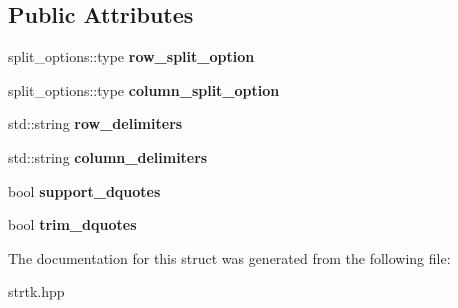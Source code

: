 \subsection*{Public Attributes}
\begin{DoxyCompactItemize}
\item 
\hypertarget{structstrtk_1_1token__grid_1_1options_a37711a26d2bd83d04107cf87e8893cf1}{split\-\_\-options\-::type {\bfseries row\-\_\-split\-\_\-option}}\label{structstrtk_1_1token__grid_1_1options_a37711a26d2bd83d04107cf87e8893cf1}

\item 
\hypertarget{structstrtk_1_1token__grid_1_1options_aa191493315b3802d1ee3b12c8bd0553e}{split\-\_\-options\-::type {\bfseries column\-\_\-split\-\_\-option}}\label{structstrtk_1_1token__grid_1_1options_aa191493315b3802d1ee3b12c8bd0553e}

\item 
\hypertarget{structstrtk_1_1token__grid_1_1options_abd58aa3a83066f92ef50a52055e42bc6}{std\-::string {\bfseries row\-\_\-delimiters}}\label{structstrtk_1_1token__grid_1_1options_abd58aa3a83066f92ef50a52055e42bc6}

\item 
\hypertarget{structstrtk_1_1token__grid_1_1options_a822c2ffc81765ec5b7e2091b64f88a5f}{std\-::string {\bfseries column\-\_\-delimiters}}\label{structstrtk_1_1token__grid_1_1options_a822c2ffc81765ec5b7e2091b64f88a5f}

\item 
\hypertarget{structstrtk_1_1token__grid_1_1options_a6f21807635d2077fab1cb2dd5f8c267c}{bool {\bfseries support\-\_\-dquotes}}\label{structstrtk_1_1token__grid_1_1options_a6f21807635d2077fab1cb2dd5f8c267c}

\item 
\hypertarget{structstrtk_1_1token__grid_1_1options_a2aeb182400c23da8783790a175471f81}{bool {\bfseries trim\-\_\-dquotes}}\label{structstrtk_1_1token__grid_1_1options_a2aeb182400c23da8783790a175471f81}

\end{DoxyCompactItemize}


The documentation for this struct was generated from the following file\-:\begin{DoxyCompactItemize}
\item 
strtk.\-hpp\end{DoxyCompactItemize}
